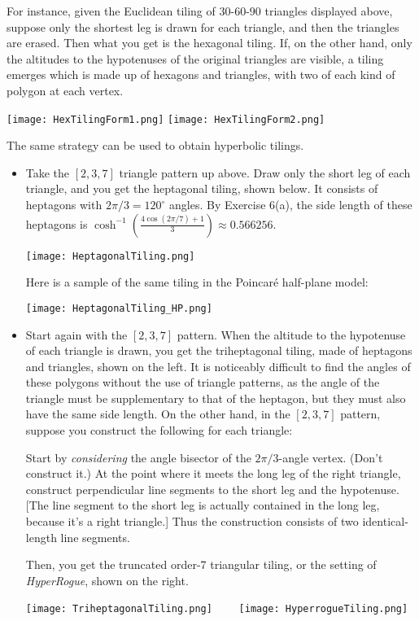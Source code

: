 \documentclass[leqno]{book}
\begin{document}
For instance, given the Euclidean tiling of 30-60-90 triangles displayed above, suppose only the shortest leg is drawn for each triangle, and then the triangles are erased.  Then what you get is the hexagonal tiling.  If, on the other hand, only the altitudes to the hypotenuses of the original triangles are visible, a tiling emerges which is made up of hexagons and triangles, with two of each kind of polygon at each vertex.
\begin{center}
\texttt{[image: HexTilingForm1.png]}
\texttt{[image: HexTilingForm2.png]}
\end{center}
The same strategy can be used to obtain hyperbolic tilings.
\begin{itemize}
\item Take the $[2,3,7]$ triangle pattern up above.  Draw only the short leg of each triangle, and you get the heptagonal tiling, shown below.  It consists of heptagons with $2\pi/3=120^\circ$ angles.  By Exercise 6(a), the side length of these heptagons is $\cosh^{-1}\left(\frac{4\cos(2\pi/7)+1}3\right)\approx 0.566256$.
\begin{center}
\texttt{[image: HeptagonalTiling.png]}
\end{center}
Here is a sample of the same tiling in the Poincar\'e half-plane model:
\begin{center}
\texttt{[image: HeptagonalTiling\_HP.png]}
\end{center}

\item Start again with the $[2,3,7]$ pattern.  When the altitude to the hypotenuse of each triangle is drawn, you get the triheptagonal tiling, made of heptagons and triangles, shown on the left.  It is noticeably difficult to find the angles of these polygons without the use of triangle patterns, as the angle of the triangle must be supplementary to that of the heptagon, but they must also have the same side length.  On the other hand, in the $[2,3,7]$ pattern, suppose you construct the following for each triangle:
\begin{center}
Start by \emph{considering} the angle bisector of the $2\pi/3$-angle vertex.  (Don't construct it.)  At the point where it meets the long leg of the right triangle, construct perpendicular line segments to the short leg and the hypotenuse.  [The line segment to the short leg is actually contained in the long leg, because it's a right triangle.]  Thus the construction consists of two identical-length line segments.
\end{center}
Then, you get the truncated order-7 triangular tiling, or the setting of \emph{HyperRogue}, shown on the right.
\begin{center}
\texttt{[image: TriheptagonalTiling.png]}~~~~
\texttt{[image: HyperrogueTiling.png]}
\end{center}


\end{itemize}
\end{document}

